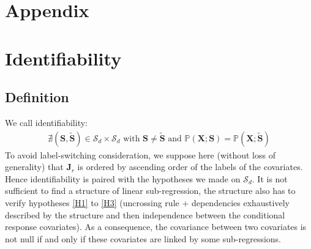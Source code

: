 \documentclass[11pt,a4paper]{article}
\begin{document}
%	
%	
	
		\section*{Appendix}\label{sectionident}
		\section{Identifiability}
		\subsection{Definition}
		We call identifiability:
\begin{eqnarray}
	\nexists (\boldsymbol{S},\tilde{\boldsymbol{S}}) \in \mathcal{S}_d\times \mathcal{S}_d \textrm{ with } \boldsymbol{S} \neq \tilde{\boldsymbol{S}} \textrm{ and }
	\mathbb{P}(\boldsymbol{X};\boldsymbol{S})=\mathbb{P}(\boldsymbol{X};\tilde{\boldsymbol{S}})
 \end{eqnarray}
 To avoid label-switching consideration, we suppose here (without loss of generality) that $\boldsymbol{J}_r$ is ordered by ascending order of the labels of the covariates.
	Hence identifiability is paired with the hypotheses we made on $ \mathcal{S}_d$. It is not sufficient to find a structure of linear sub-regression, the structure also has to verify hypotheses \ref{H1} to \ref{H3} (uncrossing rule + dependencies exhaustively described by the structure and then independence between the conditional response covariates). As a consequence, the covariance between two covariates is not null if and only if these covariates are linked by some sub-regressions.
 
\end{document}
